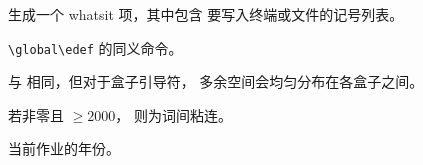 \begin{glossinventory}
\item [\cs{write\gr{number}\gr{general text}}]
      生成一个 whatsit 项，其中包含
      要写入终端或文件的记号列表。

\item [\cs{xdef}]
      \verb-\global\edef- 的同义命令。

\item [\cs{xleaders}]
      与  相同，但对于盒子引导符，
      多余空间会均匀分布在各盒子之间。

\item [\cs{xspaceskip}]
      若非零且 ${}\geq2000$，
      则为词间粘连。

\item [\cs{year}]
      当前作业的年份。
\end{glossinventory}
